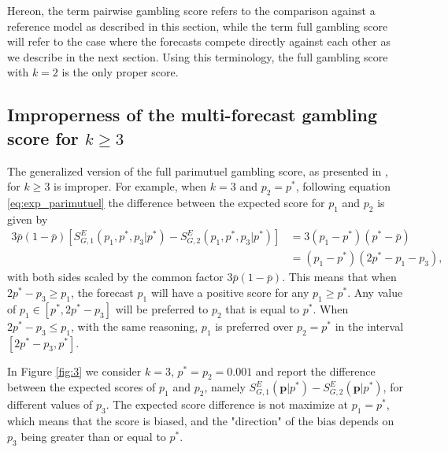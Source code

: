 \documentclass[referee,sn-basic]{sn-jnl}
\theoremstyle{thmstyleone}%
\theoremstyle{thmstyletwo}%
\theoremstyle{thmstylethree}%
\begin{document}
Hereon, the term pairwise gambling score refers to the comparison against a reference model as described in this section, while the term full gambling score will refer to the case where the forecasts compete directly against each other as we describe in the next section. Using this terminology, the full gambling score with $k = 2$ is the only proper score. 

\subsection{Improperness of the multi-forecast gambling score for $k \geq 3$ }

The generalized version of the full parimutuel gambling score, as presented in \cite{zechar2014}, for $k\geq 3$ is improper. For example, when $k = 3$ and $p_2 = p^*$, following equation \ref{eq:exp_parimutuel} the difference between the expected score for $p_1$ and $p_2$ is given by 
$$
\begin{aligned}
3\bar p(1-\bar p)[S^E_{G,1}(p_1, p^*, p_3\vert p^*) - S^E_{G,2}(p_1, p^*, p_3\vert p^*)] &= 3(p_1 - p^*)( p^* - \bar p)\\
&= (p_1 - p^*)(2p^* - p_1 - p_3 ) ,
\end{aligned}
$$
with both sides scaled by the common factor $3\bar p (1-\bar p)$. This means that when $2p^* - p_3 \geq p_1$, the forecast $p_1$ will have a positive score for any $p_1 \geq p^*$. Any value of $p_1 \in [p^*, 2p^* - p_3]$ will be preferred to $p_2$ that is equal to $p^*$. When $2p^* - p_3 \leq p_1$, with the same reasoning, $p_1$ is preferred over $p_2=p^*$ in the interval $[2p^* - p_3, p^*]$. 

In Figure \ref{fig:3} we consider $k = 3$, $p^* = p_2 = 0.001$ and report the difference between the expected scores of $p_1$ and $p_2$, namely $S^E_{G,1}(\mathbf p\vert  p^*) - S^E_{G,2}(\mathbf p\vert p^*)$, for different values of $p_3$. The expected score difference is not maximize at $p_1 = p^*$, which means that the score is biased, and the "direction" of the bias depends on $p_3$ being greater than or equal to $p^*$.
\end{document}
